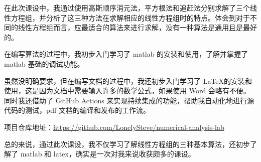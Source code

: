 在此次课设中，我通过使用高斯顺序消元法，平方根法和追赶法分别求解了三个线性方程组，并分析了这三种方法在求解相应的线性方程组时的特点。体会到对于不同的线性方程组而言，应最适合的算法来进行求解，没有一种算法是通用且是最好的。

在编写算法的过程中，我初步入门学习了 matlab 的安装和使用，了解并掌握了 matlab 基础的调试功能。

虽然没明确要求，但在编写文档的过程中，我还初步入门学习了 \LaTeX 的安装和使用，这是因为文档中需要输入许多的数学公式，如果使用 Word 会略有不便。
同时我还借助了 GitHub Actions 来实现持续集成的功能，帮助我自动化地进行源代码的测试，pdf 文档的编译和发布的工作流。

项目仓库地址：\href{https://github.com/LonelySteve/numerical-analysis-lab}{https://github.com/LonelySteve/numerical-analysis-lab}

总的来说，通过此次课设，我不仅学习了解线性方程组的三种基本算法，还初步了解了 matlab 和 latex，确实是一次对我来说收获颇多的课设。
